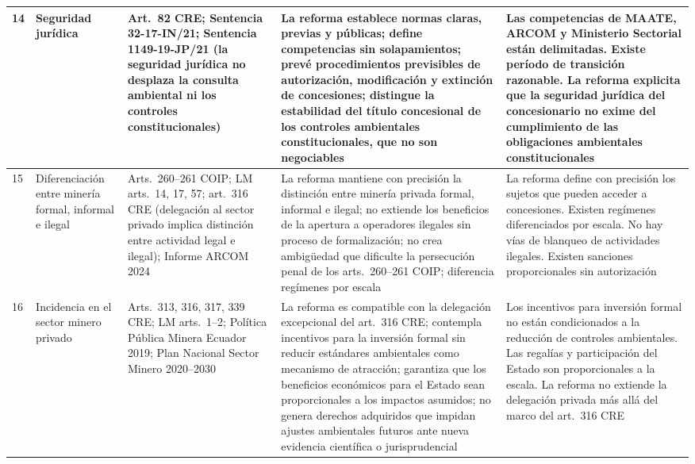 \begin{longtable}{|p{}|p{}|p{}|p{}|p{}|}
14 &
Seguridad jurídica &
Art.\ 82 CRE; Sentencia 32-17-IN/21; Sentencia 1149-19-JP/21 (la seguridad jurídica no desplaza la consulta ambiental ni los controles constitucionales) &
La reforma establece normas claras, previas y públicas; define competencias sin solapamientos; prevé procedimientos previsibles de autorización, modificación y extinción de concesiones; distingue la estabilidad del título concesional de los controles ambientales constitucionales, que no son negociables &
Las competencias de MAATE, ARCOM y Ministerio Sectorial están delimitadas. Existe período de transición razonable. La reforma explicita que la seguridad jurídica del concesionario no exime del cumplimiento de las obligaciones ambientales constitucionales \\
\hline

15 &
Diferenciación entre minería formal, informal e ilegal &
Arts.\ 260--261 COIP; LM arts.\ 14, 17, 57; art.\ 316 CRE (delegación al sector privado implica distinción entre actividad legal e ilegal); Informe ARCOM 2024 &
La reforma mantiene con precisión la distinción entre minería privada formal, informal e ilegal; no extiende los beneficios de la apertura a operadores ilegales sin proceso de formalización; no crea ambigüedad que dificulte la persecución penal de los arts.\ 260--261 COIP; diferencia regímenes por escala &
La reforma define con precisión los sujetos que pueden acceder a concesiones. Existen regímenes diferenciados por escala. No hay vías de blanqueo de actividades ilegales. Existen sanciones proporcionales sin autorización \\
\hline

16 &
Incidencia en el sector minero privado &
Arts.\ 313, 316, 317, 339 CRE; LM arts.\ 1--2; Política Pública Minera Ecuador 2019; Plan Nacional Sector Minero 2020--2030 &
La reforma es compatible con la delegación excepcional del art.\ 316 CRE; contempla incentivos para la inversión formal sin reducir estándares ambientales como mecanismo de atracción; garantiza que los beneficios económicos para el Estado sean proporcionales a los impactos asumidos; no genera derechos adquiridos que impidan ajustes ambientales futuros ante nueva evidencia científica o jurisprudencial &
Los incentivos para inversión formal no están condicionados a la reducción de controles ambientales. Las regalías y participación del Estado son proporcionales a la escala. La reforma no extiende la delegación privada más allá del marco del art.\ 316 CRE \\
\hline

\end{longtable}
\endgroup


